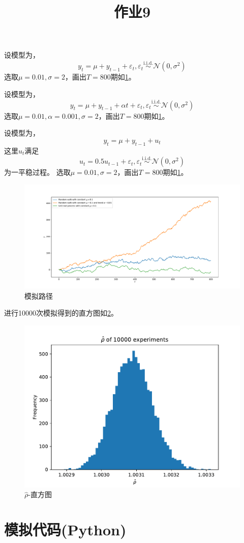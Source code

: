 \documentclass[cn]{homework}
\title{作业9}
\begin{document}
    \maketitle
    \problem[带常数项的随机游走过程]
    设模型为，
    \[y_t=\mu+y_{t-1}+\varepsilon_t,
    \varepsilon_t\overset{\text{i.i.d.}}\sim\mathcal N(0,\sigma^2)\]
    选取$\mu=0.01,\sigma=2$，画出$T=800$期如\cref{fig:seq}。

    \problem[带常数和趋势项的随机游走]
    设模型为，
    \[y_t=\mu+y_{t-1}+\alpha t+\varepsilon_t,
    \varepsilon_t\overset{\text{i.i.d.}}\sim\mathcal N(0,\sigma^2)\]
    选取$\mu=0.01,\alpha=0.001,\sigma=2$，画出$T=800$期如\cref{fig:seq}。


    \problem[带常数项的单位根过程]
    设模型为，
    \[y_t=\mu+y_{t-1}+u_t\]
    这里$u_t$满足 
    \[u_t=0.5u_{t-1}+\varepsilon_t,
    \varepsilon_t\overset{\text{i.i.d.}}\sim\mathcal N(0,\sigma^2)\]
    为一平稳过程。
    选取$\mu=0.01,\sigma=2$，画出$T=800$期如\cref{fig:seq}。

    \begin{figure}[h]
        \centering
        \includegraphics[width=\textwidth]{seq}
        \caption{模拟路径}
        \label{fig:seq}
    \end{figure}

    \problem[第二种情况rho统计量]
    进行10000次模拟得到的直方图如\cref{fig:rho}。
    \begin{figure}[h]
        \centering
        \includegraphics[width=\textwidth]{rho}
        \caption{$\hat\rho$-直方图}
        \label{fig:rho}
    \end{figure}

    \newpage
    \appendix
    \section{模拟代码(Python)}
    
\end{document}
